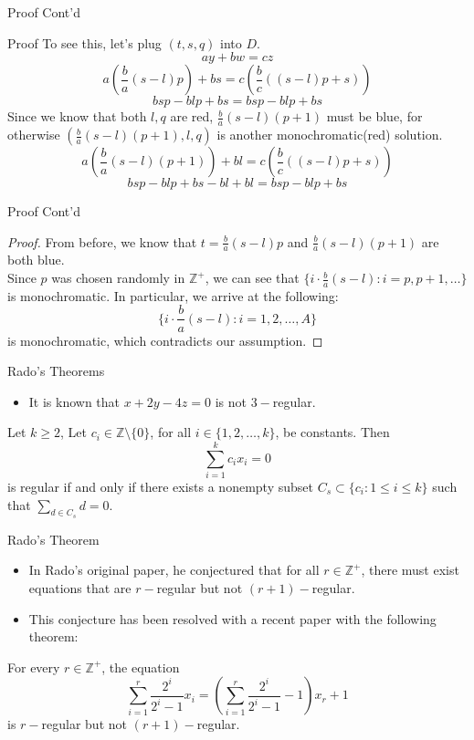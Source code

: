 \documentclass{beamer}
\newcommand{\Z}{\mathbb Z} %
\begin{document}
\begin{frame}[t]{Proof Cont'd}
    \begin{block}{Proof}
        To see this, let's plug $(t,s,q)$ into $D$.
        $$ay+bw=cz$$
        $$a(\frac{b}{a}(s-l)p) + bs = c(\frac{b}{c}((s-l)p+s))$$
        $$bsp - blp + bs = bsp - blp + bs$$
        \pause
        Since we know that both $l,q$ are red, $\frac{b}{a}(s-l)(p+1)$ must be blue, for otherwise $(\frac{b}{a}(s-l)(p+1), l,q)$ is another monochromatic(red) solution.
        \pause
        $$a(\frac{b}{a}(s-l)(p+1)) + bl = c(\frac{b}{c}((s-l)p+s))$$
        $$bsp - blp + bs - bl + bl = bsp - blp + bs$$
    \end{block}
\end{frame}

\begin{frame}{Proof Cont'd}
    \begin{proof}
        From before, we know that $t=\frac{b}{a}(s-l)p$ and $\frac{b}{a}(s-l)(p+1)$ are both blue. \\
		\pause        
        Since $p$ was chosen randomly in $\Z^+$, we can see that $\{i\cdot \frac{b}{a}(s-l):i=p,p+1,\dots\}$ is monochromatic. In particular, we arrive at the following: 
        $$\{i\cdot \frac{b}{a}(s-l):i=1,2,\dots,A\}$$
        is monochromatic, which contradicts our assumption. 
    \end{proof}
\end{frame}

\begin{frame}{Rado's Theorems}
    \begin{itemize}
        \item It is known that $x+2y-4z=0$ is not $3-$regular. 
        \pause
    \end{itemize}
    \begin{Theorem}
        Let $k\geq 2$, Let $c_i\in \Z \setminus \{0\}$, for all $i \in \{1,2,\dots, k\}$, be constants. Then 
        $$\sum^k_{i=1}c_ix_i=0$$
        is regular if and only if there exists a nonempty subset $C_s \subset \{c_i:1 \leq i \leq k\}$ such that $\sum_{d\in C_s}d=0$.  
    \end{Theorem}
\end{frame}

\begin{frame}{Rado's Theorem}
    \begin{itemize}
        \item In Rado's original paper, he conjectured that for all $r\in \Z^+$, there must exist equations that are $r-$regular but not $(r+1)-$regular. 
        \pause
        \item This conjecture has been resolved with a recent paper with the following theorem:
    \end{itemize}
    \begin{Theorem}
        For every $r\in \Z^+$, the equation
        $$\sum^r_{i=1}\frac{2^i}{2^i-1}x_i = (\sum^r_{i=1}\frac{2^i}{2^i-1}-1)x_r+1$$
        is $r-$regular but not $(r+1)-$regular. 
    \end{Theorem}
\end{frame}
\end{document}
